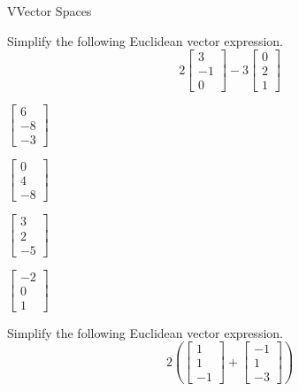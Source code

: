 \documentclass{article}[12pt]
\begin{document}
\begin{module}{V}{Vector Spaces}
  \begin{readinessAssuranceTest}
  \item Simplify the following Euclidean vector expression.
    \[
    2
    \begin{bmatrix}
      3 \\ -1 \\ 0
    \end{bmatrix}-
    3
    \begin{bmatrix}
      0 \\ 2 \\ 1
    \end{bmatrix}
    \]

  \begin{multicols}{4}
  \begin{readinessAssuranceTestChoices}
  \item \(
      \begin{bmatrix}
        6 \\ -8 \\ -3
      \end{bmatrix}
    \) %
  \item \(
          \begin{bmatrix}
            0 \\ 4 \\ -8
          \end{bmatrix}
        \)
  \item \(
          \begin{bmatrix}
            3 \\ 2 \\ -5
          \end{bmatrix}
        \)
  \item \(
          \begin{bmatrix}
            -2 \\ 0 \\ 1
          \end{bmatrix}
        \)
  \end{readinessAssuranceTestChoices}
  \end{multicols}

  \item Simplify the following Euclidean vector expression.
    \[
    2\left(
    \begin{bmatrix}
      1 \\ 1 \\ -1
    \end{bmatrix}+
    \begin{bmatrix}
      -1 \\ 1 \\ -3
    \end{bmatrix}\right)
    \]


\end{readinessAssuranceTest}
\end{module}
\end{document}
